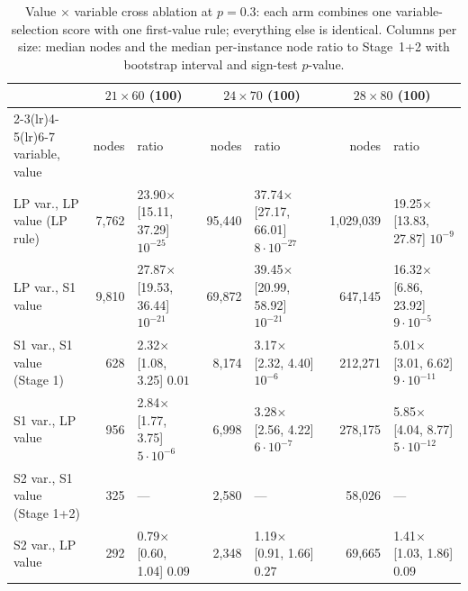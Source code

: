 \begin{table}[t]
\centering
\caption{Value $\times$ variable cross ablation at $p=0.3$: each arm combines one variable-selection score with one first-value rule; everything else is identical. Columns per size: median nodes and the median per-instance node ratio to Stage~1+2 with bootstrap interval and sign-test $p$-value.}
\label{tab:cross}
\scriptsize
\begin{tabular}{lrlrlrl}
\toprule
 & \multicolumn{2}{c}{$21\times60$ (100)} & \multicolumn{2}{c}{$24\times70$ (100)} & \multicolumn{2}{c}{$28\times80$ (100)} \\
\cmidrule(lr){2-3}\cmidrule(lr){4-5}\cmidrule(lr){6-7}
variable, value & nodes & ratio & nodes & ratio & nodes & ratio \\
\midrule
LP var., LP value (LP rule) & 7,762 & 23.90$\times$ [15.11, 37.29] $10^{-25}$ & 95,440 & 37.74$\times$ [27.17, 66.01] $8\cdot10^{-27}$ & 1,029,039 & 19.25$\times$ [13.83, 27.87] $10^{-9}$ \\
LP var., S1 value & 9,810 & 27.87$\times$ [19.53, 36.44] $10^{-21}$ & 69,872 & 39.45$\times$ [20.99, 58.92] $10^{-21}$ & 647,145 & 16.32$\times$ [6.86, 23.92] $9\cdot10^{-5}$ \\
S1 var., S1 value (Stage 1) & 628 & 2.32$\times$ [1.08, 3.25] $0.01$ & 8,174 & 3.17$\times$ [2.32, 4.40] $10^{-6}$ & 212,271 & 5.01$\times$ [3.01, 6.62] $9\cdot10^{-11}$ \\
S1 var., LP value & 956 & 2.84$\times$ [1.77, 3.75] $5\cdot10^{-6}$ & 6,998 & 3.28$\times$ [2.56, 4.22] $6\cdot10^{-7}$ & 278,175 & 5.85$\times$ [4.04, 8.77] $5\cdot10^{-12}$ \\
S2 var., S1 value (Stage 1+2) & 325 & --- & 2,580 & --- & 58,026 & --- \\
S2 var., LP value & 292 & 0.79$\times$ [0.60, 1.04] $0.09$ & 2,348 & 1.19$\times$ [0.91, 1.66] $0.27$ & 69,665 & 1.41$\times$ [1.03, 1.86] $0.09$ \\
\bottomrule
\end{tabular}
\end{table}